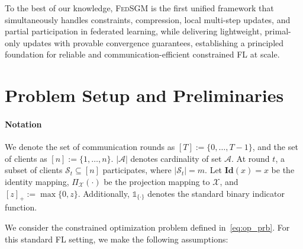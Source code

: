 \documentclass{article} %
\def\A{{\mathcal A}}
\def\S{{\mathcal S}}
\begin{document}
 
To the best of our knowledge, \textsc{FedSGM} is the first unified framework that simultaneously handles {constraints, compression, local multi-step updates, and partial participation} in federated learning, while delivering lightweight, primal-only updates with provable convergence guarantees, establishing a principled foundation for reliable and communication-efficient constrained FL at scale.

\section{Problem Setup and Preliminaries}
\vspace{-0.5em}
\paragraph{Notation}
We denote the set of communication rounds as $[T] := \{0, \ldots, T-1\}$, and the set of clients as $[n] := \{1, \ldots, n\}$. $|\A|$ denotes  cardinality of set $\A$. At round $t$, a subset of clients $\S_t \subseteq [n]$ participates, where $|\S_t| = m$. Let $\mathbf{Id}(x) = x$  be the identity mapping, $\Pi_{\mathcal{X}}(\cdot)$ be the projection mapping to $\mathcal{X}$, and  $[z]_+ := \max\{0, z\}$. Additionally, $\mathds{1}_{\{\cdot\}}$ denotes the standard binary indicator function.

We consider the constrained optimization problem defined in~\cref{eq:op_prb}. For this standard FL setting, we make the following assumptions:
\end{document}
